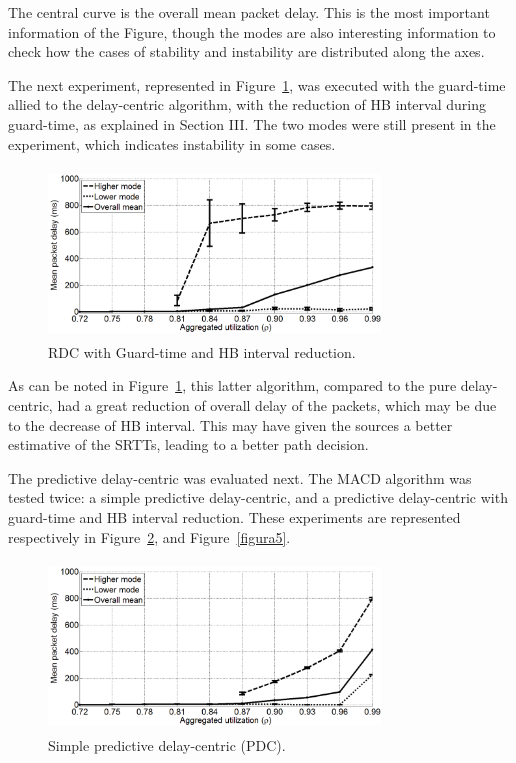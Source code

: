 \documentclass[letterpaper,10pt,oneside,conference,final]{sbrt2015}
\begin{document}
The central curve is the overall mean packet delay. This is the most important information of the Figure, though the modes are also interesting information to check how the cases of stability and instability are distributed along the axes.

The next experiment, represented in Figure~\ref{figura3}, was executed with the guard-time allied to the delay-centric algorithm, with the reduction of HB interval during guard-time, as explained in Section III. The two modes were still present in the experiment, which indicates instability in some cases.

\begin{figure}[h!]
	\centering
	\includegraphics[width=8.8cm,height=4.5cm]{figura3}
	\caption{RDC with Guard-time and HB interval reduction.}
	\label{figura3}
\end{figure}

As can be noted in Figure~\ref{figura3}, this latter algorithm, compared to the pure delay-centric, had a great reduction of overall delay of the packets, which may be due to the decrease of HB interval. This may have given the sources a better estimative of the SRTTs, leading to a better path decision. 

The predictive delay-centric was evaluated next. The MACD algorithm was tested twice: a simple predictive delay-centric, and a predictive delay-centric with guard-time and HB interval reduction. These experiments are represented respectively in Figure~\ref{figura4}, and Figure~\ref{figura5}.


\begin{figure}[h!]
\centering
\includegraphics[width=8.8cm,height=4.5cm]{figura4}
\caption{Simple predictive delay-centric (PDC).}
\label{figura4}
\end{figure}
\end{document}
